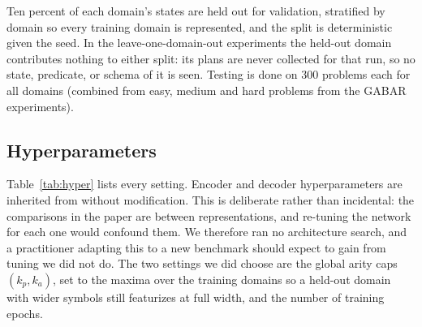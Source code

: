 \documentclass{article} %
\begin{document}
Ten percent of each domain's states are held out for validation, stratified
by domain so every training domain is represented, and the split is
deterministic given the seed. In the leave-one-domain-out experiments the
held-out domain contributes nothing to either split: its plans are never
collected for that run, so no state, predicate, or schema of it is seen.
Testing is done on 300 problems each for all domains (combined from easy, medium and hard problems from the GABAR experiments). 

\subsection{Hyperparameters}
\label{app:hyper}

Table~\ref{tab:hyper} lists every setting. Encoder and decoder
hyperparameters are inherited from \citet{gabar} without modification. This
is deliberate rather than incidental: the comparisons in the paper are
between representations, and re-tuning the network for each one would
confound them. We therefore ran no architecture search, and a practitioner
adapting this to a new benchmark should expect to gain from tuning we did not
do. The two settings we did choose are the global arity caps $(k_p, k_a)$,
set to the maxima over the training domains so a held-out domain with wider
symbols still featurizes at full width, and the number of training epochs.
\end{document}
